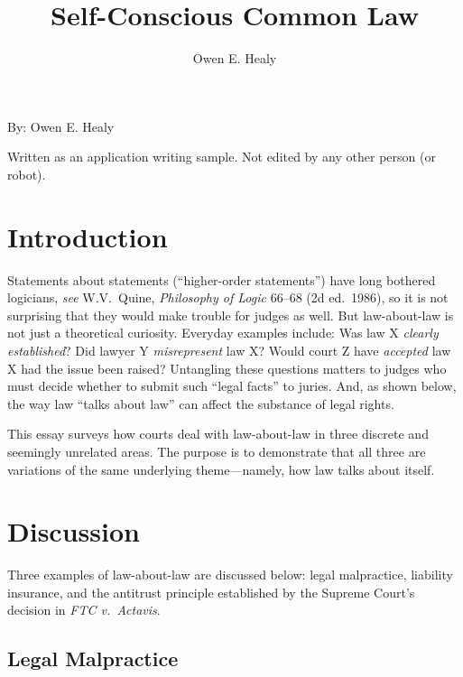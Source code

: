 \documentclass[
  12pt,
  letterpaper,
]{scrartcl}
\title{Self-Conscious Common Law}
\author{Owen E. Healy}
\begin{document}
\begin{center}\end{center}
  
\vspace{12pt}\noindent\begin{minipage}{4in}
  \setlength{\parskip}{6pt}
  
  \noindent By: Owen E. Healy

  \noindent Written as an application writing sample. Not edited by any other person (or robot).
\end{minipage}


\vspace{12pt}\section{Introduction}

Statements about statements (``higher-order statements'') have long bothered
logicians, \textit{see} W.V.~Quine, \textit{Philosophy of Logic} 66--68 (2d
ed.~1986), so it is not surprising that they would make trouble for judges as
well. But law-about-law is not just a theoretical curiosity. Everyday examples
include: Was law X \emph{clearly established}? Did lawyer Y \emph{misrepresent}
law X? Would court Z have \emph{accepted} law X had the issue been raised?
Untangling these questions matters to judges who must decide whether to submit
such ``legal facts'' to juries. And, as shown below, the way law ``talks about
law'' can affect the substance of legal rights.

This essay surveys how courts deal with law-about-law in three discrete and
seemingly unrelated areas. The purpose is to demonstrate that all three are
variations of the same underlying theme---namely, how law talks about itself.


\section{Discussion}

Three examples of law-about-law are discussed below: legal malpractice,
liability insurance, and the antitrust principle established by the Supreme Court's decision
in \textit{FTC v.~Actavis}.


\subsection{Legal Malpractice}
\end{document}
